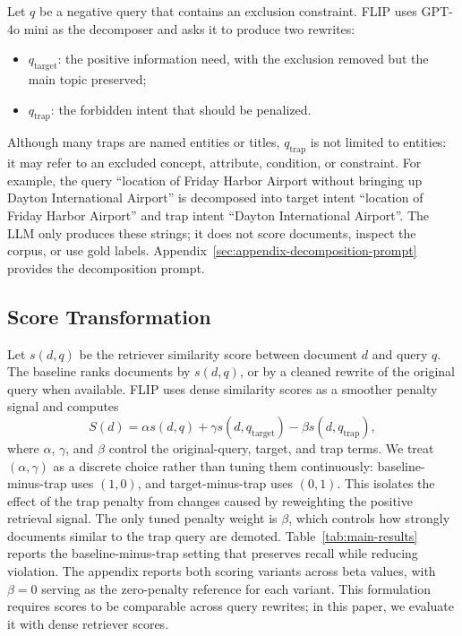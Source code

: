 \documentclass[11pt]{article}
\newcommand{\method}{FLIP\xspace}
\begin{document}
Let $q$ be a negative query that contains an exclusion constraint.
\method uses GPT-4o mini as the decomposer and asks it to produce two rewrites:
\begin{itemize}
    \item $q_{\mathrm{target}}$: the positive information need, with the exclusion removed but the main topic preserved;
    \item $q_{\mathrm{trap}}$: the forbidden intent that should be penalized.
\end{itemize}
Although many traps are named entities or titles, $q_{\mathrm{trap}}$ is not limited to entities: it may refer to an excluded concept, attribute, condition, or constraint.
For example, the query ``location of Friday Harbor Airport without bringing up Dayton International Airport'' is decomposed into target intent ``location of Friday Harbor Airport'' and trap intent ``Dayton International Airport''.
The LLM only produces these strings; it does not score documents, inspect the corpus, or use gold labels.
Appendix~\ref{sec:appendix-decomposition-prompt} provides the decomposition prompt.

\subsection{Score Transformation}

Let $s(d,q)$ be the retriever similarity score between document $d$ and query $q$.
The baseline ranks documents by $s(d,q)$, or by a cleaned rewrite of the original query when available.
\method uses dense similarity scores as a smoother penalty signal and computes
\begin{equation}
    S(d) = \alpha s(d,q) + \gamma s(d,q_{\mathrm{target}})
           - \beta s(d,q_{\mathrm{trap}}),
    \label{eq:flip}
\end{equation}
where $\alpha$, $\gamma$, and $\beta$ control the original-query, target, and trap terms.
We treat $(\alpha,\gamma)$ as a discrete choice rather than tuning them continuously: baseline-minus-trap uses $(1,0)$, and target-minus-trap uses $(0,1)$.
This isolates the effect of the trap penalty from changes caused by reweighting the positive retrieval signal.
The only tuned penalty weight is $\beta$, which controls how strongly documents similar to the trap query are demoted.
Table~\ref{tab:main-results} reports the baseline-minus-trap setting that preserves recall while reducing violation.
The appendix reports both scoring variants across beta values, with $\beta=0$ serving as the zero-penalty reference for each variant.
This formulation requires scores to be comparable across query rewrites; in this paper, we evaluate it with dense retriever scores.
\end{document}
